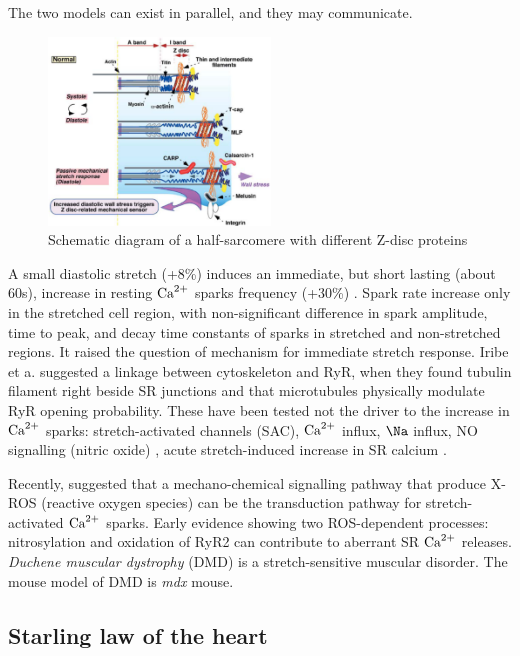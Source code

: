 The two models can exist in parallel, and they may communicate.

\begin{figure}[hbt]
  \centerline{\includegraphics[height=5cm,
    angle=0]{./images/sarcomere_proteins.eps}}
  \caption{Schematic diagram of a half-sarcomere with different Z-disc proteins
  \citep{knoll2003}}
  \label{fig:sarcomere_protein}
\end{figure}

A small diastolic stretch (+8\%) induces an immediate, but short lasting (about
60s), increase in resting ${\text{Ca}^{2+}}$ sparks frequency (+30\%) \citep{iribe2009}.
Spark rate increase only in the stretched cell region, with non-significant
difference in spark amplitude, time to peak, and decay time constants of sparks
in stretched and non-stretched regions. It raised the question of mechanism for
immediate stretch response.
Iribe et a. suggested a linkage between cytoskeleton and RyR, when they found
tubulin filament right beside SR junctions and that microtubules physically
modulate RyR opening probability. These have been tested not the driver to the
increase in ${\text{Ca}^{2+}}$ sparks: stretch-activated channels (SAC), ${\text{Ca}^{2+}}$ influx, $\Na$
influx, NO signalling (nitric oxide) \citep{iribe2009}, acute stretch-induced
increase in SR calcium \citep{iribe2008}.

Recently, \citep{prosser2011} suggested that
a mechano-chemical signalling pathway that produce X-ROS (reactive oxygen
species) can be the transduction pathway for stretch-activated ${\text{Ca}^{2+}}$ sparks.
Early evidence showing two ROS-dependent processes: nitrosylation and oxidation
of RyR2 can contribute to aberrant SR ${\text{Ca}^{2+}}$ releases. {\it Duchene muscular
dystrophy} (DMD) is a stretch-sensitive muscular disorder.
The mouse model of DMD is {\it mdx} mouse.

\subsection{Starling law of the heart}

